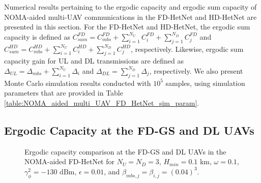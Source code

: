 Numerical results pertaining to the ergodic capacity and ergodic sum capacity of NOMA-aided multi-UAV communications in the FD-HetNet and HD-HetNet are presented in this section. For the FD-HetNet and HD-HetNet, the ergodic sum capacity is defined as $C_{sum}^{FD} = C_{mbs}^{FD} + \sum_{i=1}^{N_U} C_{i}^{FD} + \sum_{j=1}^{N_D} C_{j}^{FD}$ and $C_{sum}^{HD} = C_{mbs}^{HD} + \sum_{i=1}^{N_U} C_{i}^{HD} + \sum_{j=1}^{N_D} C_{j}^{HD}$, respectively. Likewise, ergodic sum capacity gain for UL and DL transmissions are defined as $\Delta_{UL} = \Delta_{mbs} + \sum_{i=1}^{N_U} \Delta_i$ and $\Delta_{DL} = \sum_{j=1}^{N_D} \Delta_j$, respectively. We also present Monte Carlo simulation results conducted with $10^{5}$ samples, using simulation parameters that are provided in Table \ref{table:NOMA_aided_multi_UAV_FD_HetNet_sim_param}.


\subsection{Ergodic Capacity at the FD-GS and DL UAVs}

\begin{figure}[h]
\centering
{} \vspace{0cm}
\hfil
{}
\caption{Ergodic capacity comparison at the FD-GS and DL UAVs in the NOMA-aided FD-HetNet for $N_U = N_D = 3$, $H_{min} = 0.1$ km, $\omega = 0.1$, $\gamma_{\phi}^2 = -130\text{ dBm}$, $\epsilon = 0.01$, and $\beta_{mbs,j} = \beta_{i,j} = (0.04)^3$.}
\label{fig:NOMA_aided_multi_UAV_FD_HetNet_erg_cap_fd_hetnet}
\end{figure}

